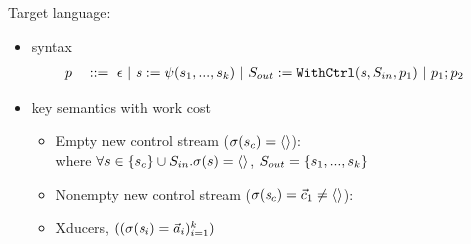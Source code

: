 \documentclass{beamer}
\begin{document}
\begin{frame}{Target language: {\fmsvcode}}
\begin{itemize}
	\item syntax 
	\begin{alignat*}{2}
	&p  && :: = \ \epsilon  \ | \ \sdef{\s}{\psi(s_1,...,s_k)} \ | \ \withctrl{\s}{p_1}{\Sin}{\Sout} \ | \ p_1;p_2  
	\end{alignat*}
	\item key semantics with work cost
	\begin{itemize}
		\item Empty new control stream ($\sigma(s_c) = \langle \rangle$):
		\\[2ex]
		where $\forall s \in \{s_c\} \cup S_{in}. \sigma(s) = \langle \rangle$, $S_{out} = \{s_1,...,s_k\}$ 
		
		\item Nonempty new control stream ($\sigma(\mathit{s}_c)= \vec c_1 \ne \langle \rangle$):
		\\[2ex]
	
	\item  Xducers, $((\sigma(\mathit{s}_i) = \vec a_i)^k_{i=1})$ \\
	\end{itemize}		

\end{itemize}
\end{frame}
\end{document}
